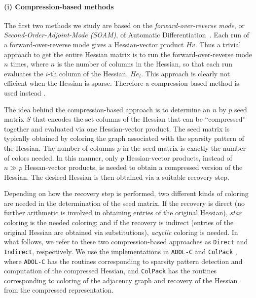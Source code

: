 \documentclass[10pt, a4paper, english]{article}
\begin{document}
\paragraph{(i) Compression-based methods}
The first two methods we study are based on the {\em forward-over-reverse mode}, or {\em Second-Order-Adjoint-Mode (SOAM)}, of Automatic Differentiation~\cite{griewank2008evaluating, naumann2012art}. Each run of a forward-over-reverse mode gives a Hessian-vector product $Hv$. Thus a trivial approach to get the entire Hessian matrix is to run the forward-over-reverse mode $n$ times, where $n$ is the number of columns in the Hessian, so that each run evaluates the $i$-th column of the Hessian, $He_i$. This approach is clearly not efficient  when the Hessian is sparse.  Therefore a compression-based method is used instead \cite{gebremedhin2009efficient}. 

The idea behind the compression-based approach is to determine an $n$ by $p$ seed matrix $S$
that encodes the set columns of the Hessian that can be ``compressed'' together and evaluated via one Hessian-vector product. The seed matrix is typically obtained by
coloring the graph associated with the sparsity pattern of the Hessian. 
The number of columns $p$ in the seed matrix is exactly the number of colors needed. 
In this manner, only $p$ Hessian-vector products, instead of $n \gg p$ Hessan-vector products, is needed to obtain a compressed version of the Hessian. The desired Hessian is then obtained via a suitable recovery step.  

Depending on how the recovery step is performed, two different kinds of coloring are needed in the determination of the seed matrix. If the recovery is direct (no further arithmetic is involved in obtaining entries of the original Hessian),  {\em star} coloring is the needed coloring;
and if the recovery is indirect (entries of the original Hessian are obtained via substitutions), {\em acyclic} coloring is needed. In what follows, we refer to these two compression-based approaches  as {\tt Direct} and {\tt Indirect}, respectively. We use the implementations in {\tt ADOL-C} \cite{walther2009getting} and {\tt ColPack} \cite{gebremedhin2013colpack}, where {\tt ADOL-C} has the routines corresponding to sparsity pattern detection and computation of the compressed Hessian, and {\tt ColPack} has the routines  corresponding to coloring of the adjacency graph and recovery of the Hessian from the compressed representation.
\end{document}
